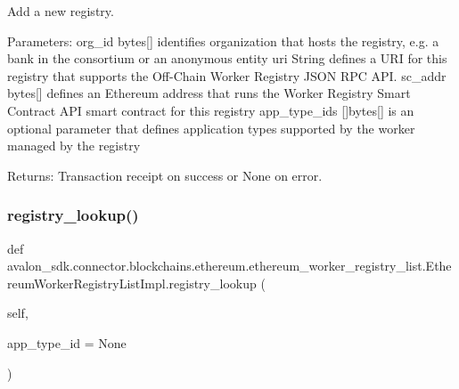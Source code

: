 \begin{DoxyVerb}Add a new registry.

Parameters:
org_id       bytes[] identifies organization that hosts the
     registry, e.g. a bank in the consortium or an
     anonymous entity
uri          String defines a URI for this registry that
     supports the Off-Chain Worker Registry
     JSON RPC API.
sc_addr      bytes[] defines an Ethereum address that
     runs the Worker Registry Smart Contract API
     smart contract for this registry
app_type_ids []bytes[] is an optional parameter that defines
     application types supported by the worker
     managed by the registry

Returns:
Transaction receipt on success or None on error.
\end{DoxyVerb}
 \mbox{\label{classavalon__sdk_1_1connector_1_1blockchains_1_1ethereum_1_1ethereum__worker__registry__list_1_1EthereumWorkerRegistryListImpl_a181025d95e2300a662b5d6e822142713}} 
\subsubsection{\texorpdfstring{registry\+\_\+lookup()}{registry\_lookup()}}
{\footnotesize\ttfamily def avalon\+\_\+sdk.\+connector.\+blockchains.\+ethereum.\+ethereum\+\_\+worker\+\_\+registry\+\_\+list.\+Ethereum\+Worker\+Registry\+List\+Impl.\+registry\+\_\+lookup (\begin{DoxyParamCaption}\item[{}]{self,  }\item[{}]{app\+\_\+type\+\_\+id = {\ttfamily None} }\end{DoxyParamCaption})}

